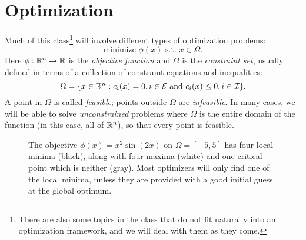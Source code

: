 \documentclass[12pt, leqno]{article} %
\begin{document}
\section{Optimization}

Much of this class\footnote{%
  There are also some topics in the class that do not fit naturally
  into an optimization framework, and we will deal with them as they come.
} will involve different types of optimization problems:
\begin{equation}
  \mbox{minimize } \phi(x) \mbox{ s.t. } x \in \Omega.
\end{equation}
Here $\phi : \mathbb{R}^n \rightarrow \mathbb{R}$ is the {\em objective function} and 
$\Omega$ is the {\em constraint set}, usually defined in terms of a
collection of constraint equations and inequalities:
\[
\Omega = \{ x \in \mathbb{R}^n :
  c_i(x) = 0, i \in \mathcal{E} \mbox{ and }
  c_i(x) \leq 0, i \in \mathcal{I} \}.
\]
A point in $\Omega$ is called {\em feasible}; points outside
$\Omega$ are {\em infeasible}.  In many cases, we will be able to
solve {\em unconstrained} problems where $\Omega$ is the entire domain of
the function (in this case, all of $\mathbb{R}^n$), so that every point is
feasible.

\begin{figure}
  \begin{center}
  \caption{The objective $\phi(x) = x^2 \sin(2x)$ on $\Omega = [-5,5]$
    has four local minima (black), along with four maxima (white) and
    one critical point which is neither (gray).  Most optimizers will
    only find one of the local minima, unless they are provided with
    a good initial guess at the global optimum.}
  \end{center}
\end{figure}
\end{document}
